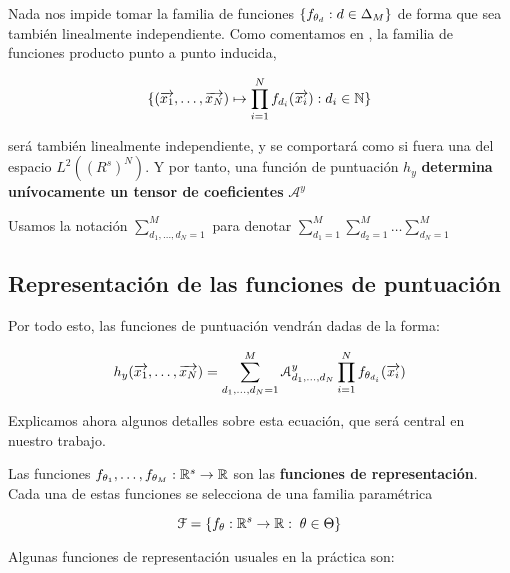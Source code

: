 \begin{observacion}

	Nada nos impide tomar la familia de funciones $\{f_{\theta_d}: d \in \Delta_{M}\}$ de forma que sea también linealmente independiente. Como comentamos en , la familia de funciones producto punto a punto inducida,

	\begin{equation}
		\{ (\overrightarrow{x_1}, \ldots, \overrightarrow{x_N}) \mapsto \prod_{i = 1}^N f_{d_i}(\overrightarrow{x_i}): d_i \in \mathbb{N} \}
	\end{equation}

	será también linealmente independiente, y se comportará como si fuera una  del espacio $L^2((R^s)^N)$. Y por tanto, una función de puntuación $h_y$ \textbf{determina unívocamente un tensor de coeficientes} $\mathcal{A}^y$

\end{observacion}

\begin{observacion}
	Usamos la notación $\sum_{d_1, \ldots, d_N = 1}^{M}$ para denotar $\sum_{d_1 = 1}^{M} \sum_{d_2 = 1}^{M} \ldots \sum_{d_N = 1}^{M}$
\end{observacion}

\subsection{Representación de las funciones de puntuación} \label{sec:repr_funciones_puntuacion}

Por todo esto, las funciones de puntuación vendrán dadas de la forma:

\begin{equation} \label{eq:puntuacion_general}
	h_y(\overrightarrow{x_1}, \ldots, \overrightarrow{x_N}) = \sum_{d_1, \ldots, d_N = 1}^{M} \mathcal{A}^y_{d_1, \ldots, d_N} \prod_{i = 1}^N f_{\theta_{d_i}}(\overrightarrow{x_i})
\end{equation}

Explicamos ahora algunos detalles sobre esta ecuación, que será central en nuestro trabajo.

Las funciones $f_{\theta_1}, \ldots, f_{\theta_M}: \mathbb{R}^s \to \mathbb{R}$ son las \textbf{funciones de representación}. Cada una de estas funciones se selecciona de una familia paramétrica

$$\mathcal{F} = \{ f_{\theta}: \mathbb{R}^s \to \mathbb{R}: \; \theta \in \Theta \}$$

Algunas funciones de representación usuales en la práctica son:

